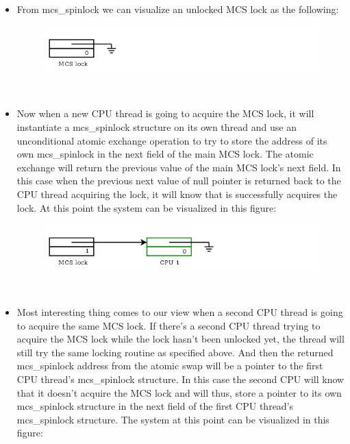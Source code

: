 \documentclass[10pt,preprint]{sigplanconf}
\begin{document}
\begin{itemize}
	\item From mcs\_spinlock we can visualize an unlocked MCS lock as the following:\\
	\begin{figure}[h]
		\includegraphics[scale=0.4]{mcslock1.png}
	\end{figure}\\
	\item Now when a new CPU thread is going to acquire the MCS lock, it will instantiate a mcs\_spinlock structure on its own thread and use an unconditional atomic exchange operation to try to store the address of its own mcs\_spinlock in the next field of the main MCS lock. The atomic exchange will return the previous value of the main MCS lock's next field. In this case when the previous next value of null pointer is returned back to the CPU thread acquiring the lock, it will know that is successfully acquires the lock. At this point the system can be visualized in this figure:\\
	\begin{figure}[h!]
		\includegraphics[scale=0.4]{mcslock2.png}
	\end{figure}\\
	\item Most interesting thing comes to our view when a second CPU thread is going to acquire the same MCS lock. If there's a second CPU thread trying to acquire the MCS lock while the lock hasn't been unlocked yet, the thread will still try the same locking routine as specified above. And then the returned mcs\_spinlock address from the atomic swap will be a pointer to the first CPU thread's mcs\_spinlock structure. In this case the second CPU will know that it doesn't acquire the MCS lock and will thus, store a pointer to its own mcs\_spinlock structure in the next field of the first CPU thread's mcs\_spinlock structure. The system at this point can be visualized in this figure:
	\begin{figure}[h!]

\end{figure}
\end{itemize}
\end{document}
